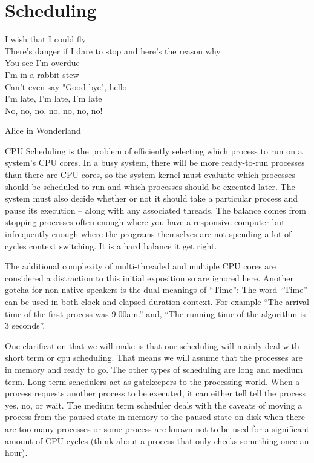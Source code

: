 \chapter{Scheduling}

\epigraph{I wish that I could fly\\
There's danger if I dare to stop and here's the reason why\\
You see I'm overdue\\
I'm in a rabbit stew\\
Can't even say "Good-bye", hello\\
I'm late, I'm late, I'm late\\
No, no, no, no, no, no, no!}{Alice in Wonderland}


CPU Scheduling is the problem of efficiently selecting which process to run on a system's CPU cores. In a busy system, there will be more ready-to-run processes than there are CPU cores, so the system kernel must evaluate which processes should be scheduled to run and which processes should be executed later. The system must also decide whether or not it should take a particular process and pause its execution -- along with any associated threads. The balance comes from stopping processes often enough where you have a responsive computer but infrequently enough where the programs themselves are not spending a lot of cycles context switching. It is a hard balance it get right.

The additional complexity of multi-threaded and multiple CPU cores are considered a distraction to this initial exposition so are ignored here. Another gotcha for non-native speakers is the dual meanings of ``Time'': The word ``Time'' can be used in both clock and elapsed duration context. For example ``The arrival time of the first process was 9:00am.'' and, ``The running time of the algorithm is 3 seconds''.

One clarification that we will make is that our scheduling will mainly deal with short term or cpu scheduling. That means we will assume that the processes are in memory and ready to go. The other types of scheduling are long and medium term. Long term schedulers act as gatekeepers to the processing world. When a process requests another process to be executed, it can either tell tell the process yes, no, or wait. The medium term scheduler deals with the caveats of moving a process from the paused state in memory to the paused state on disk when there are too many processes or some process are known not to be used for a significant amount of CPU cycles (think about a process that only checks something once an hour).

